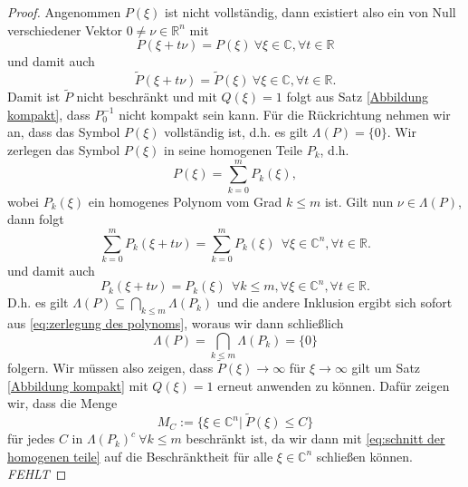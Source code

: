 \begin{proof}
\item Angenommen $P(\xi)$ ist nicht vollständig, dann existiert also ein von Null verschiedener Vektor $0 \not = \nu \in \mathbb{R}^n$ mit
\begin{equation}
P(\xi + t \nu)  = P(\xi) \ \forall \xi \in \mathbb{C}, \forall t \in \mathbb{R}
\end{equation}
und damit auch 
\begin{equation}
\tilde{P}(\xi + t \nu) = \tilde{P}(\xi) \ \forall \xi \in \mathbb{C}, \forall t \in \mathbb{R}.
\end{equation}
Damit ist $\tilde{P}$ nicht beschränkt und mit $Q(\xi) = 1$ folgt aus Satz \ref{Abbildung kompakt}, dass $P_0^{-1}$ nicht kompakt sein kann. Für die Rückrichtung nehmen wir an, dass das Symbol $P(\xi)$ vollständig ist, d.h. es gilt $\Lambda (P)= \{0\}$. Wir zerlegen das Symbol $P(\xi)$ in seine homogenen Teile $P_k$, d.h.
\begin{equation}\label{eq:zerlegung des polynoms}
P(\xi) = \sum_{k=0}^m P_k(\xi),
\end{equation}
wobei $P_k(\xi)$ ein homogenes Polynom vom Grad $k \leq m$ ist.
Gilt nun $\nu \in \Lambda (P)$, dann folgt
\begin{equation}
\sum_{k=0}^m P_k (\xi + t \nu) = \sum_{k=0}^m P_k (\xi) \ \  \forall \xi \in \mathbb{C}^n, \forall t \in \mathbb{R}.
\end{equation}
und damit auch
\begin{equation}
P_k (\xi + t \nu) = P_k (\xi) \ \ \forall k \leq m,  \forall \xi \in \mathbb{C}^n, \forall t \in \mathbb{R}.
\end{equation}
D.h. es gilt $\Lambda(P) \subseteq \bigcap_{k \leq m} \Lambda (P_k)$ und die andere Inklusion ergibt sich sofort aus \eqref{eq:zerlegung des polynoms}, woraus wir dann schließlich
\begin{equation}\label{eq:schnitt der homogenen teile}
\Lambda(P) = \bigcap_{k \leq m} \Lambda (P_k) = \{0\}
\end{equation}
folgern. Wir müssen also zeigen, dass $\tilde{P}(\xi) \rightarrow \infty$ für $\xi \rightarrow \infty$ gilt um Satz \ref{Abbildung kompakt} mit $Q(\xi) =1$ erneut anwenden zu können. Dafür zeigen wir, dass die Menge
\begin{equation}
M_C := \{\xi \in \mathbb{C}^n | \ \tilde{P}(\xi) \leq C\}
\end{equation}
für jedes $C$ in ${\Lambda(P_k)}^c \ \forall k \leq m$ beschränkt ist, da wir dann mit \eqref{eq:schnitt der homogenen teile} auf die Beschränktheit für alle $\xi \in \mathbb{C}^n$ schließen können.
\\ \textit{FEHLT} %
\end{proof}
